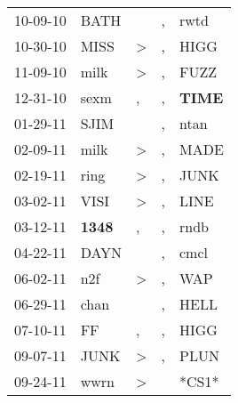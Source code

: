 \begin{supertabular}{p{0.07\textwidth}p{0.06\textwidth}p{0.02\textwidth}p{0.02\textwidth}p{0.06\textwidth}}
          10-09-10\textsuperscript{} &           BATH\textsuperscript{} &                  &             , &           rwtd\textsuperscript{} \\
          10-30-10\textsuperscript{} &           MISS\textsuperscript{} &     \textgreater &             , &           HIGG\textsuperscript{} \\
          11-09-10\textsuperscript{} &           milk\textsuperscript{} &     \textgreater &             , &           FUZZ\textsuperscript{} \\
          12-31-10\textsuperscript{} &           sexm\textsuperscript{} &                , &             , &  \textbf{TIME\textsuperscript{}} \\
          01-29-11\textsuperscript{} &           SJIM\textsuperscript{} &                  &             , &           ntan\textsuperscript{} \\
          02-09-11\textsuperscript{} &           milk\textsuperscript{} &     \textgreater &             , &           MADE\textsuperscript{} \\
          02-19-11\textsuperscript{} &           ring\textsuperscript{} &     \textgreater &             , &           JUNK\textsuperscript{} \\
          03-02-11\textsuperscript{} &           VISI\textsuperscript{} &     \textgreater &             , &           LINE\textsuperscript{} \\
          03-12-11\textsuperscript{} &  \textbf{1348\textsuperscript{}} &                , &             , &           rndb\textsuperscript{} \\
          04-22-11\textsuperscript{} &           DAYN\textsuperscript{} &                  &             , &           cmcl\textsuperscript{} \\
          06-02-11\textsuperscript{} &            n2f\textsuperscript{} &     \textgreater &             , &            WAP\textsuperscript{} \\
          06-29-11\textsuperscript{} &           chan\textsuperscript{} &                  &             , &           HELL\textsuperscript{} \\
          07-10-11\textsuperscript{} &             FF\textsuperscript{} &                , &             , &           HIGG\textsuperscript{} \\
          09-07-11\textsuperscript{} &           JUNK\textsuperscript{} &     \textgreater &             , &           PLUN\textsuperscript{} \\
          09-24-11\textsuperscript{} &           wwrn\textsuperscript{} &     \textgreater &               &                            *CS1* \\

\end{supertabular}
